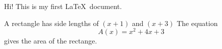 \documentclass[11pt]{article}
\begin{document}
Hi! This is my first \LaTeX\ document.

A rectangle has side lengths of $(x+1)$ and $(x+3)$
The equation $${A(x)=x^2+4x+3}$$ gives the area of the rectange.
\end{document}
